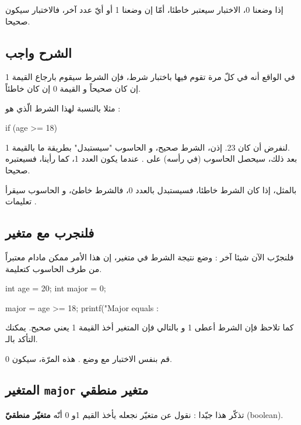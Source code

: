 إذا وضعنا 0، الاختبار سيعتبر خاطئا، أمّا إن وضعنا 1 أو أيّ عدد آخر، فالاختبار سيكون صحيحا.

\subsection{الشرح واجب}

في الواقع أنه في كلّ مرة تقوم فيها باختبار شرط، فإن الشرط سيقوم بارجاع القيمة 1 إن كان صحيحاً و القيمة 0 إن كان خاطئاً.

مثلا بالنسبة لهذا الشرط الّذي هو 
 :

\begin{Csource}
if (age >= 18)
\end{Csource}

لنفرض أن
كان 23. إذن، الشرط صحيح، و الحاسوب "سيستبدل" بطريقة ما
بالقيمة 1.\\
بعد ذلك، سيحصل الحاسوب (في رأسه) على
.
عندما يكون العدد 1، كما رأينا، فسيعتبره صحيحا.

بالمثل، إذا كان الشرط خاطئا، فسيستبدل
بالعدد 0، فالشرط خاطئ، و الحاسوب سيقرأ تعليمات
.

\subsection{فلنجرب مع متغير}

فلنجرّب الآن شيئا آخر : وضع نتيجة الشرط في متغير، إن هذا الأمر ممكن مادام معتبراً من طرف الحاسوب كتعليمة.

\begin{Csource}
int age = 20;
int major = 0;

major = age >= 18;
printf("Major equals : %
\end{Csource}

كما تلاحظ فإن الشرط
أعطى 1 و بالتالي فإن المتغير 
أخذ القيمة 1 يعني صحيح. يمكنك التأكد بالـ.

قم بنفس الاختبار مع وضع
.
هذه المرّة،
سيكون 0.

\subsection{المتغير
\texttt{major}
متغير منطقي}

تذكّر هذا جيّدا : نقول عن متغيّر نجعله يأخذ القيم 1و 0 أنّه
\textbf{متغيّر منطقيّ}
(\textenglish{boolean}).

